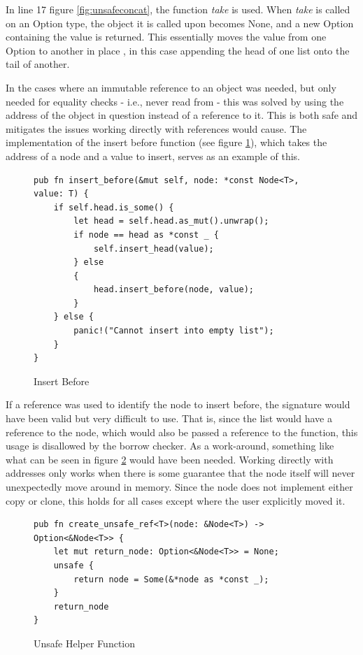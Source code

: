 In line 17 figure \ref{fig:unsafeconcat}, the function \textit{take} is used. When \textit{take} is called on an Option type, the object it is called upon becomes None, and a new Option containing the value is returned. This essentially moves the value from one Option to another in place \cite{RUSTMANUAL}, in this case appending the head of one list onto the tail of another.

In the cases where an immutable reference to an object was needed, but only needed for equality checks - i.e., never read from - this was solved by using the address of the object in question instead of a reference to it. This is both safe and mitigates the issues working directly with references would cause. The implementation of the insert before function (see figure \ref{fig:insertbefore}), which takes the address of a node and a value to insert, serves as an example of this.

\begin{figure}[H]
 \vspace{12pt}
\begin{lstlisting}[style=RUSTSTYLE]
pub fn insert_before(&mut self, node: *const Node<T>, value: T) {
    if self.head.is_some() {
        let head = self.head.as_mut().unwrap();
        if node == head as *const _ {
            self.insert_head(value);
        } else
        {
            head.insert_before(node, value);
        } 
    } else {
        panic!("Cannot insert into empty list");
    }
}
\end{lstlisting}
    \caption{Insert Before}
    \label{fig:insertbefore}
\end{figure}

If a reference was used to identify the node to insert before, the signature would have been valid but very difficult to use. That is, since the list would have a reference to the node, which would also be passed a reference to the function, this usage is disallowed by the borrow checker. As a work-around, something like what can be seen in figure \ref{fig:unsafehelper} would have been needed. Working directly with addresses only works when there is some guarantee that the node itself will never unexpectedly move around in memory. Since the node does not implement either copy or clone, this holds for all cases except where the user explicitly moved it.

\begin{figure}[H]
 \vspace{12pt}
\begin{lstlisting}[style=RUSTSTYLE]
pub fn create_unsafe_ref<T>(node: &Node<T>) -> Option<&Node<T>> {
    let mut return_node: Option<&Node<T>> = None;
    unsafe { 
        return node = Some(&*node as *const _);
    }
    return_node
}
\end{lstlisting}
    \caption{Unsafe Helper Function}
    \label{fig:unsafehelper}
\end{figure}


